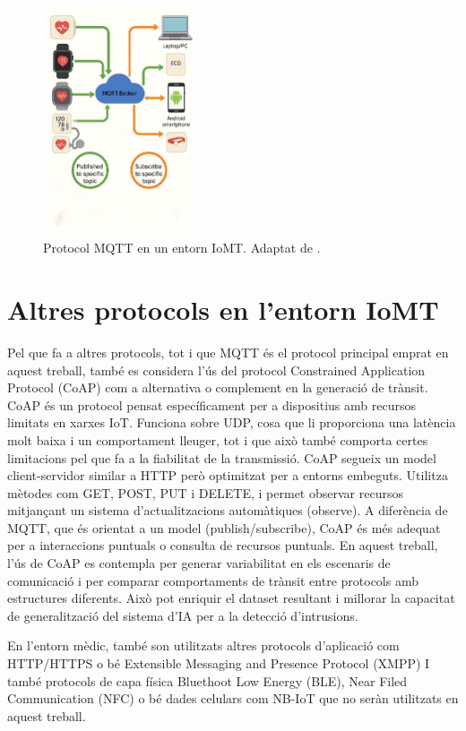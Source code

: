   \begin{figure}[ht]
    \centering
    \includegraphics[width=0.4\textwidth]{img/MQTT_IoMT.jpg}
    \caption{Protocol MQTT en un entorn IoMT. Adaptat de \cite{mqttfig}.}
    \label{fig:MQTT}
  \end{figure}

  \section{Altres protocols en l'entorn IoMT}
  Pel que fa a altres protocols, tot i que MQTT és el protocol principal emprat en aquest treball, també es considera l’ús del protocol Constrained Application Protocol (CoAP) com a alternativa o complement en la generació de trànsit. CoAP és un protocol pensat específicament per a dispositius amb recursos limitats en xarxes IoT. Funciona sobre UDP, cosa que li proporciona una latència molt baixa i un comportament lleuger, tot i que això també comporta certes limitacions pel que fa a la fiabilitat de la transmissió.
  CoAP segueix un model client-servidor similar a HTTP però optimitzat per a entorns embeguts. Utilitza mètodes com GET, POST, PUT i DELETE, i permet observar recursos mitjançant un sistema d’actualitzacions automàtiques (observe). A diferència de MQTT, que és orientat a un model (publish/subscribe), CoAP és més adequat per a interaccions puntuals o consulta de recursos puntuals.
  En aquest treball, l'ús de CoAP es contempla per generar variabilitat en els escenaris de comunicació i per comparar comportaments de trànsit entre protocols amb estructures diferents. Això pot enriquir el dataset resultant i millorar la capacitat de generalització del sistema d’IA per a la detecció d’intrusions.
  
  En l’entorn mèdic, també son utilitzats altres protocols d’aplicació com HTTP/HTTPS o bé Extensible Messaging and Presence Protocol (XMPP) I també protocols de capa física Bluethoot Low Energy (BLE), Near Filed Communication (NFC) o bé dades celulars com NB-IoT que no seràn utilitzats en aquest treball. 
\or

